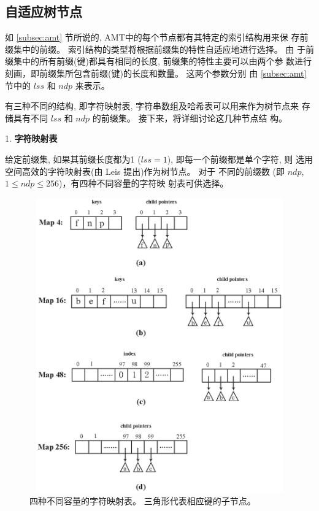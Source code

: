 \subsection{自适应树节点}
\label{subsec:nodes}

如 \ref{subsec:amt} 节所说的, AMT中的每个节点都有其特定的索引结构用来保
存前缀集中的前缀。 索引结构的类型将根据前缀集的特性自适应地进行选择。 由
于前缀集中的所有前缀(键)都具有相同的长度, 前缀集的特性主要可以由两个参
数进行刻画，即前缀集所包含前缀(键)的长度和数量。 这两个参数分别
由 \ref{subsec:amt} 节中的 $lss$ 和 $ndp$ 来表示。

有三种不同的结构, 即字符映射表, 字符串数组及哈希表可以用来作为树节点来
存储具有不同 $lss$ 和 $ndp$ 的前缀集。 接下来，将详细讨论这几种节点结
构。

1. \textbf{字符映射表}

给定前缀集, 如果其前缀长度都为1 ($lss=1$), 即每一个前缀都是单个字符, 则
选用空间高效的字符映射表(由 Leis \cite{Leis2013} 提出)作为树节点。 对于
不同的前缀数 (即 $ndp$, $1 \leq ndp \leq 256$)，有四种不同容量的字符映
射表可供选择。

\begin{figure}[H]
  \centering
  \includegraphics[height=5in, width=5in]{figures/2_MPM/character_map}
  \caption{四种不同容量的字符映射表。 三角形代表相应键的子节点。}
  \label{fig:character map}
\end{figure}

